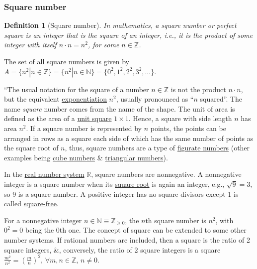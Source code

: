 \documentclass{article}
\newtheorem{definition}{Definition}
\begin{document}
\subsubsection{Square number}

\begin{definition}[Square number]
	In mathematics, a \emph{square number} or \emph{perfect square} is an integer that is the square of an integer, i.e., it is the product of some integer with itself $n\cdot n = n^2$, for some $n\in\mathbb{Z}$. 
\end{definition}
The set of all square numbers is given by $A = \{n^2|n\in\mathbb{Z}\} = \{n^2|n\in\mathbb{N}\} = \{0^2,1^2,2^2,3^2,\ldots\}$.
 
``The usual notation for the square of a number $n\in\mathbb{Z}$ is not the product $n\cdot n$, but the equivalent \href{https://en.wikipedia.org/wiki/Exponentiation}{exponentiation} $n^2$, usually pronounced as ``$n$ squared''. The name \textit{square} number comes from the name of the shape. The unit of area is defined as the area of a \href{https://en.wikipedia.org/wiki/Unit_square}{unit square} $1\times1$. Hence, a square with side length $n$ has area $n^2$. If a square number is represented by $n$ points, the points can be arranged in rows as a square each side of which has the same number of points as the square root of $n$, thus, square numbers are a type of \href{https://en.wikipedia.org/wiki/Figurate_number}{figurate numbers} (other examples being \href{https://en.wikipedia.org/wiki/Cube_(algebra)}{cube numbers} \& \href{https://en.wikipedia.org/wiki/Triangular_numbers}{triangular numbers}).

In the \href{https://en.wikipedia.org/wiki/Real_number}{real number system} $\mathbb{R}$, square numbers are nonnegative. A nonnegative integer is a square number when its \href{https://en.wikipedia.org/wiki/Square_root}{square root} is again an integer, e.g., $\sqrt{9} = 3$, so 9 is a square number. A positive integer has no square divisors except 1 is called \href{https://en.wikipedia.org/wiki/Square-free_integer}{square-free}.

For a nonnegative integer $n\in\mathbb{N}\equiv\mathbb{Z}_{\ge0}$, the $n$th square number is $n^2$, with $0^2 = 0$ being the 0th one. The concept of square can be extended to some other number systems. If rational numbers are included, then a square is the ratio of 2 square integers, \&, conversely, the ratio of 2 square integers is a square $\frac{m^2}{n^2} = \left(\frac{m}{n}\right)^2$, $\forall m,n\in\mathbb{Z}$, $n\ne0$.
\end{document}
